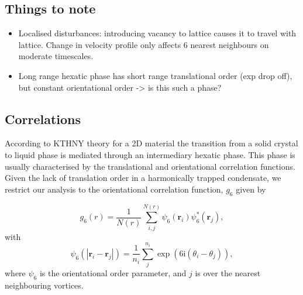 \subsection{Things to note}

\begin{itemize}
\item Localised disturbances: introducing vacancy to lattice causes it to travel with lattice. Change in velocity profile only affects 6
nearest neighbours on moderate timescales.
\item Long range hexatic phase has short range translational order (exp drop off), but constant orientational order -> is this such a phase?
\end{itemize}

\subsection{Correlations}
According to KTHNY theory for a 2D material the transition from a solid crystal to liquid phase is mediated through an intermediary hexatic
phase. This phase is usually characterised by the translational and orientational correlation functions. Given the lack of translation order
in a harmonically trapped condensate, we restrict our analysis to the orientational correlation function, $g_6$ given by
\iffalse
\begin{equation}
	\begin{aligned}
		g_6(|\mathbf{r}_i - \mathbf{r}_j|) &= \\ \frac{1}{N(r)}\displaystyle\sum_{i}^{N(r)}\displaystyle\sum_{j}^{N(r)} & \left(\frac{1}{n_j}\displaystyle\sum_{k}^{n_j}\exp(6\mathrm{i}\theta_{jk}) \right)\left(\frac{1}{n_i}\displaystyle\sum_{l}^{n_i}\exp(6\mathrm{i}\theta_{il}) \right)^{*}
	\end{aligned}
\end{equation}
\fi
\begin{equation}
	g_6(r) = \frac{1}{N(r)}\displaystyle\sum\limits_{i,j}^{N(r)}\psi_6(\mathbf{r}_i)\psi_6^{*}(\mathbf{r}_j),
\end{equation}
with
\begin{equation}
	\psi_6(|\mathbf{r}_{i} - \mathbf{r}_{j}|) = \frac{1}{n_i}\displaystyle\sum\limits_j^{n_i}\exp(6\mathrm{i}(\theta_i - \theta_j)),
\end{equation}
where $\psi_6$ is the orientational order parameter, and $j$ is over the nearest neighbouring vortices.

